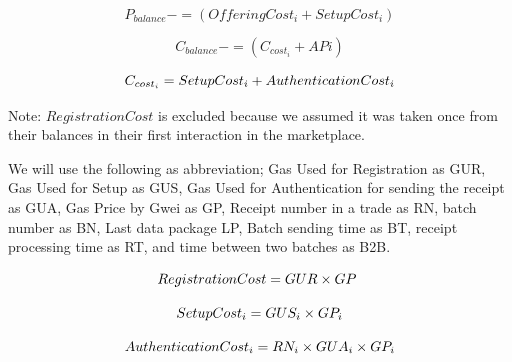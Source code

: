 \documentclass[letterpaper, 10 pt, conference]{ieeeconf}  %
\makeatletter
\newcommand{\mathleft}{\@fleqntrue\@mathmargin15pt}
\makeatother
\begin{document}
\vspace{-0.3 cm}

\mathleft
\begin{equation}
\textbf{$P_{balance} -= ( Offering Cost_{i} + Setup Cost_{i} )$} 
\end{equation}

\vspace{-0.5 cm}

\mathleft
\begin{equation}
 \textbf{$C_{balance} -= ( C_{cost_{i}} + AP{i} )$}   
\end{equation}

\vspace{-0.5 cm}

\mathleft
\begin{equation}
\textbf{$ C_{cost_{i}} = Setup Cost_{i} + Authentication Cost_{i} $} \label{C_costEq}     
\end{equation}



Note: $ Registration Cost$ is excluded because we assumed it was taken once from their balances in their first interaction in the marketplace. 

We will use the following as abbreviation; Gas Used for Registration as GUR, Gas Used for Setup as GUS, Gas Used for Authentication for sending the receipt as GUA, Gas Price by Gwei as GP, Receipt number in a trade as RN, batch number as BN, Last data package LP, Batch sending time as BT, receipt processing time as RT, and time between two batches as B2B.

\vspace{-0.5 cm}

\mathleft
\begin{equation}
\textbf{$ Registration Cost = GUR \times GP$ }   
\end{equation}

\vspace{-0.5 cm}

\mathleft
\begin{equation}
\textbf{$ Setup Cost_{i} = GUS_{i} \times GP_{i} $}    
\end{equation}

\vspace{-0.5 cm}

\mathleft
\begin{equation}
\textbf{$ Authentication Cost_{i} =  RN_{i} \times GUA_{i} \times GP_{i} $}    
\end{equation}

\vspace{-0.5 cm}
\end{document}
